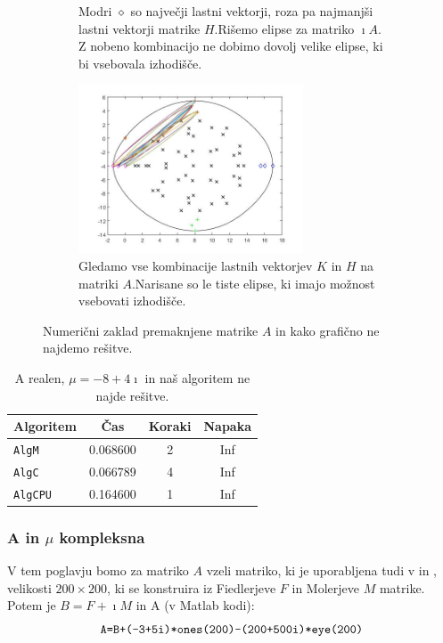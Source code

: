 \documentclass[12pt,a4paper]{amsart}
\theoremstyle{definition}
\theoremstyle{plain}
\begin{document}
\begin{figure}[H]
\begin{subfigure}[t]{0.45\textwidth}
\caption{Modri $\diamond$ so največji lastni vektorji, roza pa najmanjši lastni vektorji matrike $H$.\footnotemark[\value{footnote}] Rišemo elipse za matriko $\imath A$. Z nobeno kombinacijo ne dobimo dovolj velike elipse, ki bi vsebovala izhodišče.}
\label{fig:p63}
\end{subfigure}%
\hfill
\begin{subfigure}[t]{0.45\textwidth}
\includegraphics[width=0.9\linewidth,height=5cm]{RC4e3.jpg}
\caption{Gledamo vse kombinacije lastnih vektorjev $K$ in $H$ na matriki $A$.\footnotemark[\value{footnote}] Narisane so le tiste elipse, ki imajo možnost vsebovati izhodišče.}
\label{fig:p63}
\end{subfigure}
\caption{Numerični zaklad premaknjene matrike $A$ in kako grafično ne najdemo rešitve.}
\end{figure}

\begin{table}[H]
\caption{A realen, $\mu = -8+4\imath$ in naš algoritem ne najde rešitve.}
\begin{tabular}{|l|c|c|c|}
\hline
Algoritem & Čas & Koraki & Napaka\\
\hline
\hline
\verb+AlgM+ &0.068600&2&Inf\\
\hline
\verb+AlgC+ &0.066789 &4& Inf\\
\hline
\verb+AlgCPU+ &0.164600&1&Inf \\
\hline
\end{tabular}

\label{t6}
\end{table}

\subsubsection{A in $\mu$ kompleksna}
V tem poglavju bomo za matriko $A$ vzeli matriko,  ki je uporabljena tudi v \cite{meurant} in \cite{trije}, velikosti $200\times 200$, ki se konstruira iz Fiedlerjeve $F$ in Molerjeve $M$ matrike. Potem je $B=F + \imath M$ in A (v Matlab kodi):
$$\verb~A=B+(-3+5i)*ones(200)-(200+500i)*eye(200)~$$
\end{document}
